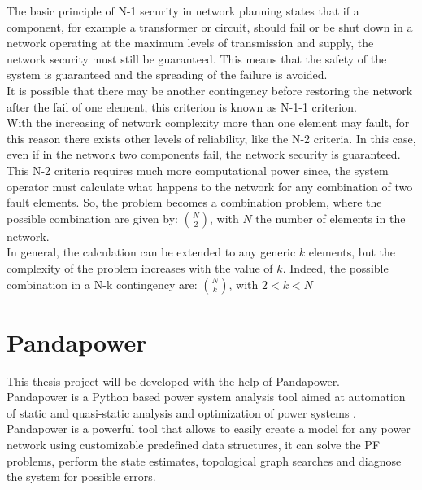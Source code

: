 The basic principle of N-1 security in network planning states that if a component, for example a transformer or circuit, should fail or be shut down in a network operating at the maximum levels of transmission and supply, the network security must still be guaranteed. This means that the safety of the system is guaranteed and the spreading of the failure is avoided. \\
It is possible that there may be another contingency before restoring the network after the fail of one element, this criterion is known as N-1-1 criterion.  \\

With the increasing of network complexity more than one element may fault, for this reason there exists other levels of reliability, like the N-2 criteria. In this case, even if in the network two components fail, the network security is guaranteed. \\
This N-2 criteria requires much more computational power since, the system operator must calculate what happens to the network for any combination of two fault elements. So, the problem becomes a combination problem, where the possible combination are given by: $N \choose 2$, with $N$ the number of elements in the network. \\

In general, the calculation can be extended to any generic $k$ elements, but the complexity of the problem increases with the value of $k$. Indeed, the possible combination in a N-k contingency are: $N \choose k$, with $2 < k < N$


\section{Pandapower}
\label{ch:pandapower}
This thesis project will be developed with the help of Pandapower. \\
Pandapower is a Python based power system analysis tool aimed at automation of static and quasi-static analysis and optimization of power systems \cite{pandapower}. \\
Pandapower is a powerful tool that allows to easily create a model for any power network using customizable predefined data structures, it can solve the \gls{PF} problems, perform the state estimates, topological graph searches and diagnose the system for possible errors.

